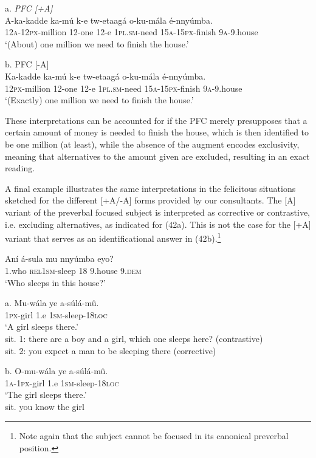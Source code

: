 \documentclass[output=paper]{langsci/langscibook}
\begin{document}
\ea
{a.  \textit{PFC [+A]}}\\
\gll A-ka-kadde  ka-mú  k-e  tw-etaagá  o-ku-mála    é-nnyúmba.\\
     \textsc{12a}{}-\textsc{12px}{}-million  12-one  12-e  \textsc{1pl}.\textsc{sm}{}-need  \textsc{15a}{}-\textsc{15px}{}-finish  \textsc{9a}{}-9.house\\
\glt ‘(About) one million we need to finish the house.’
\z

\ea
{b.  PFC [-A]}\\
\gll Ka-kadde    ka-mú  k-e  tw-etaagá  o-ku-mála    é-nnyúmba.\\
     \textsc{12px}{}-million  12-one  12-e  \textsc{1pl}.\textsc{sm}{}-need  \textsc{15a}{}-\textsc{15px}{}-finish  \textsc{9a}{}-9.house\\
\glt ‘(Exactly) one million we need to finish the house.’
\z

These interpretations can be accounted for if the PFC merely presupposes that a certain amount of money is needed to finish the house, which is then identified to be one million (at least), while the absence of the augment encodes exclusivity, meaning that alternatives to the amount given are excluded, resulting in an exact reading.

A final example illustrates the same interpretations in the felicitous situations sketched for the different [+A/-A] forms provided by our consultants. The [A] variant of the preverbal focused subject is interpreted as corrective or contrastive, i.e. excluding alternatives, as indicated for (42a). This is not the case for the [+A] variant that serves as an identificational answer in (42b).\footnote{ Note again that the subject cannot be focused in its canonical preverbal position.}

\ea
\gll   Aní  á-sula      mu  nnyúmba  eyo?\\
       1.who  \textsc{rel1sm}{}-sleep  18  9.house  9.\textsc{dem}\\
\glt   ‘Who sleeps in this house?’
\z

\ea
\gll   a.  Mu-wála  ye  a-súlá-mû.\\
         \textsc{1px}{}-girl  1.e  \textsc{1sm}{}-sleep-\textsc{18loc}\\
\glt ‘A girl sleeps there.’\\
sit. 1: there are a boy and a girl, which one sleeps here? (contrastive)\\
sit. 2: you expect a man to be sleeping there (corrective)
\z

\ea
\gll   b.  O-mu-wála  ye  a-súlá-mû.\\
         \textsc{1a}{}-\textsc{1px}{}-girl  1.e  \textsc{1sm}{}-sleep-\textsc{18loc}\\
\glt ‘The girl sleeps there.’\\
sit. you know the girl
\z
\end{document}
